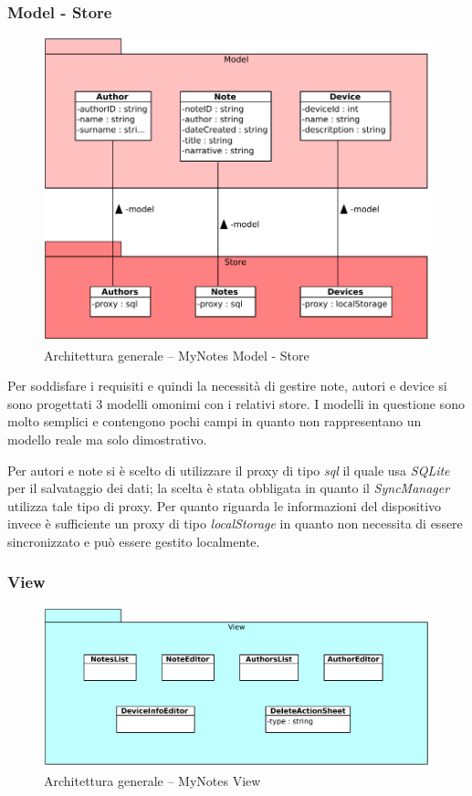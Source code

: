 \subsubsection{Model - Store}
\begin{figure}[htb]
\centering
\includegraphics[scale=0.6]{gfx/class/MyNotes_Model_Store.pdf}
\caption{Architettura generale -- MyNotes Model - Store}
\label{fig:architettura MyNotes Model-Store}
\end{figure}

Per soddisfare i requisiti e quindi la necessità di gestire note, autori e device si sono progettati 3 modelli omonimi con i relativi store.
I modelli in questione sono molto semplici e contengono pochi campi in quanto non rappresentano un modello reale ma solo dimostrativo.

Per autori e note si è scelto di utilizzare il proxy di tipo \emph{sql} il quale usa \emph{SQLite} per il salvataggio dei dati; la scelta è stata obbligata in quanto il \emph{SyncManager} utilizza tale tipo di proxy.
Per quanto riguarda le informazioni del dispositivo invece è sufficiente un proxy di tipo \emph{localStorage} in quanto non necessita di essere sincronizzato e può essere gestito localmente.

\subsubsection{View}
\begin{figure}[htb]
\centering
\includegraphics[scale=0.6]{gfx/class/MyNotes_View.pdf}
\caption{Architettura generale -- MyNotes View}
\label{fig:architettura MyNotes View}
\end{figure}


